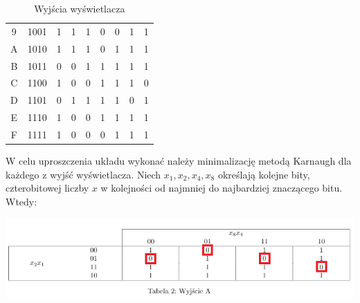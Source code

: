 \documentclass{article}
\begin{document}
\begin{center}
\begin{table}[ht]
\begin{tabularx}{\textwidth}{|c|c| *{7}{Y|}}
                         9 & 1001 & 1 & 1 & 1 & 0 & 0 & 1 & 1\\
                         A & 1010 & 1 & 1 & 1 & 0 & 1 & 1 & 1\\
                         B & 1011 & 0 & 0 & 1 & 1 & 1 & 1 & 1\\ 
                         C & 1100 & 1 & 0 & 0 & 1 & 1 & 1 & 0\\
                         D & 1101 & 0 & 1 & 1 & 1 & 1 & 0 & 1\\
                         E & 1110 & 1 & 0 & 0 & 1 & 1 & 1 & 1\\
                         F & 1111 & 1 & 0 & 0 & 0 & 1 & 1 & 1\\
                        \hline
                    \end{tabularx}
                    \caption{Wyjścia wyświetlacza}
                    \label{tab:my_label}
                \end{table}
            \end{center}
            W celu uproszczenia układu wykonać należy minimalizację metodą Karnaugh dla każdego z wyjść wyświetlacza. Niech $x_1, x_2, x_4, x_8$ określają kolejne bity, czterobitowej liczby $x$ w kolejności od najmniej do najbardziej znaczącego bitu. Wtedy:
            \begin{center}
                \includegraphics[width=18cm]{reports/img/Z1C_tab_1.png}\\
            \end{center}

                        
\end{document}

